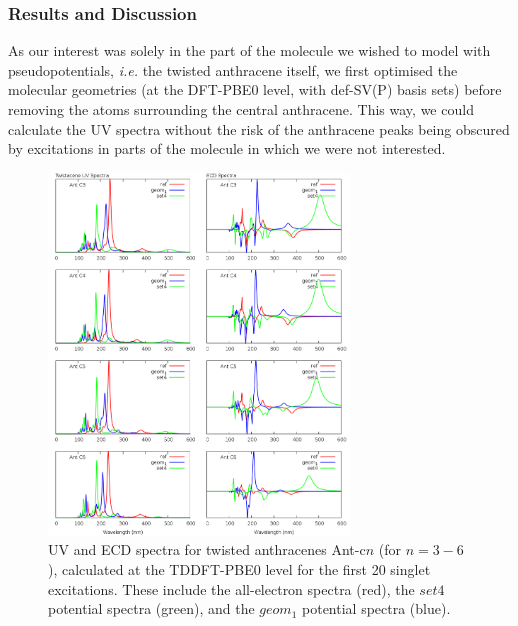 \documentclass[aip,reprint,nofootinbib]{revtex4-1}
\begin{document}
\subsubsection{Results and Discussion}

As our interest was solely in the part of the molecule we wished to model with pseudopotentials, \emph{i.e.} the twisted anthracene itself, we first optimised the molecular geometries (at the DFT-PBE0 level, with def-SV(P) basis sets) before removing the atoms surrounding the central anthracene. This way, we could calculate the UV spectra without the risk of the anthracene peaks being obscured by excitations in parts of the molecule in which we were not interested.

\begin{figure}
\begin{center}
\includegraphics[width=8cm]{twistacene_spectra}
\end{center}
\caption[Twistacene all-electron and pseudopotential spectra.]{UV and ECD spectra for twisted anthracenes Ant-c$n$ (for $n=3-6$), calculated at the TDDFT-PBE0 level for the first 20 singlet excitations. These include the all-electron spectra (red), the $set4$ potential spectra (green), and the $geom_1$ potential spectra (blue).}\label{fig:antc_spectra}
\end{figure}
\end{document}
